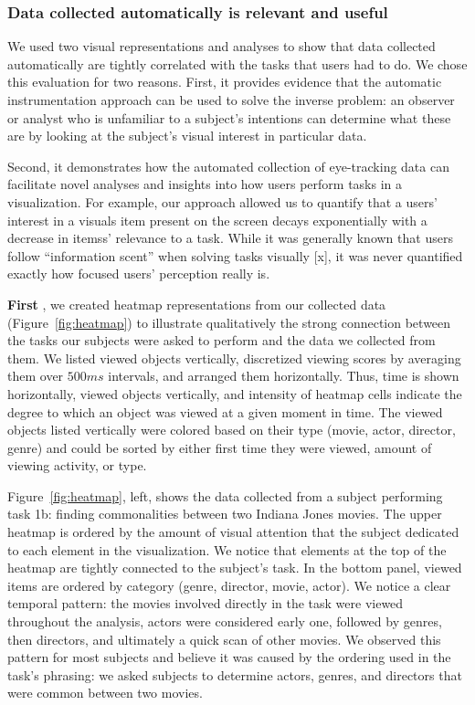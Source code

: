 \subsubsection{Data collected automatically is relevant and useful}
\label{sec:EvalDataCollected}
We used two visual representations and analyses to show that data collected automatically are tightly correlated with the tasks that users had to do. We chose this evaluation for two reasons. First, it provides evidence that the automatic instrumentation approach can be used to solve the inverse problem: an observer or analyst who is unfamiliar to a subject's intentions can determine what these are by looking at the subject's visual interest in particular data. 

Second, it demonstrates how the automated collection of eye-tracking data can facilitate novel analyses and insights into how users perform tasks in a visualization. For example, our approach allowed us to quantify that a users' interest in a visuals item present on the screen decays exponentially with a decrease in itemss' relevance to a task. While it was generally known that users follow ``information scent'' when solving tasks visually [x],  it  was never quantified exactly how focused users' perception really is.

\vspace{2mm}\noindent
\textbf{First }, we created heatmap representations from our collected data (Figure~\ref{fig:heatmap}) to illustrate qualitatively the strong connection between the tasks our subjects were asked to perform and the data we collected from them. We listed viewed objects vertically, discretized viewing scores by averaging them over $500ms$ intervals, and arranged them horizontally. Thus, time is shown horizontally, viewed objects vertically, and intensity of heatmap cells indicate the degree to which an object was viewed at a given moment in time. The viewed objects listed vertically were colored based on their type (movie, actor, director, genre) and could be sorted by either first time they were viewed, amount of viewing activity, or type.

Figure~\ref{fig:heatmap}, left, shows the data collected from a subject performing task 1b: finding commonalities between two Indiana Jones movies. The upper heatmap is ordered by the amount of visual attention that the subject dedicated to each element in the visualization. We notice that elements at the top of the heatmap are tightly connected to the subject's  task.   In the bottom panel, viewed items are ordered by category (genre, director, movie, actor). We notice a clear temporal pattern: the movies involved directly in the task were viewed throughout the analysis, actors were considered early one, followed by genres, then directors, and ultimately a quick scan of other movies. We observed this pattern for most subjects and believe it was caused by the ordering used in the task's phrasing: we asked subjects to determine actors, genres, and directors that were common between two movies.  

